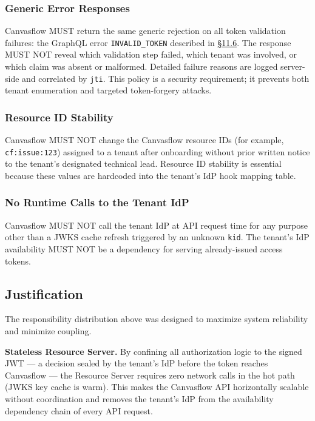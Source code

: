\subsubsection{Generic Error Responses}

Canvasflow MUST return the same generic rejection on all token validation failures:
the GraphQL error \texttt{INVALID\_TOKEN} described in
\hyperref[sec:generic-error-responses]{\S11.6}. The response MUST NOT reveal which validation step failed, which tenant was involved, or
which claim was absent or malformed. Detailed failure reasons are logged server-side and
correlated by \texttt{jti}. This policy is a security requirement; it prevents both
tenant enumeration and targeted token-forgery attacks.

\subsubsection{Resource ID Stability}

Canvasflow MUST NOT change the Canvasflow resource IDs (for example, \texttt{cf:issue:123})
assigned to a tenant after onboarding without prior written notice to the tenant's
designated technical lead. Resource ID stability is essential because these values are
hardcoded into the tenant's IdP hook mapping table.

\subsubsection{No Runtime Calls to the Tenant IdP}

Canvasflow MUST NOT call the tenant IdP at API request time for any purpose other than
a JWKS cache refresh triggered by an unknown \texttt{kid}. The tenant's IdP availability
MUST NOT be a dependency for serving already-issued access tokens.

\subsection{Justification}

The responsibility distribution above was designed to maximize system reliability and
minimize coupling.

\textbf{Stateless Resource Server.} By confining all authorization logic to the signed
JWT --- a decision sealed by the tenant's IdP before the token reaches Canvasflow --- the
Resource Server requires zero network calls in the hot path (JWKS key cache is warm).
This makes the Canvasflow API horizontally scalable without coordination and removes the
tenant's IdP from the availability dependency chain of every API request.

